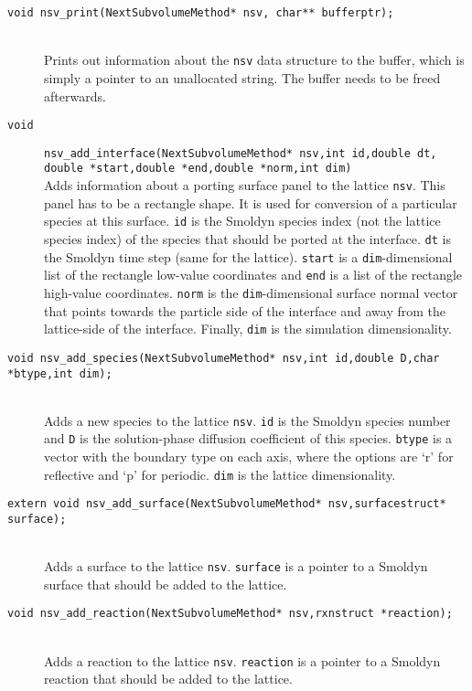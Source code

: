 \documentclass {scrbook}
\newcommand {\ttt} {\texttt}
\begin{document}
\begin{description}
\item[\ttt{void nsv\_print(NextSubvolumeMethod* nsv, char** bufferptr);}]
\hfill \\
Prints out information about the \ttt{nsv} data structure to the buffer, which is simply a pointer to an unallocated string. The buffer needs to be freed afterwards.

\item[\ttt{void}]
\ttt{nsv\_add\_interface(NextSubvolumeMethod* nsv,int id,double dt, double *start,double *end,double *norm,int dim)}
\hfill \\
Adds information about a porting surface panel to the lattice \ttt{nsv}. This panel has to be a rectangle shape. It is used for conversion of a particular species at this surface. \ttt{id} is the Smoldyn species index (not the lattice species index) of the species that should be ported at the interface. \ttt{dt} is the Smoldyn time step (same for the lattice). \ttt{start} is a \ttt{dim}-dimensional list of the rectangle low-value coordinates and \ttt{end} is a list of the rectangle high-value coordinates. \ttt{norm} is the \ttt{dim}-dimensional surface normal vector that points towards the particle side of the interface and away from the lattice-side of the interface. Finally, \ttt{dim} is the simulation dimensionality.

\item[\ttt{void nsv\_add\_species(NextSubvolumeMethod* nsv,int id,double D,char *btype,int dim);}]
\hfill \\
Adds a new species to the lattice \ttt{nsv}. \ttt{id} is the Smoldyn species number and \ttt{D} is the solution-phase diffusion coefficient of this species. \ttt{btype} is a vector with the boundary type on each axis, where the options are `r' for reflective and `p' for periodic. \ttt{dim} is the lattice dimensionality.

\item[\ttt{extern void nsv\_add\_surface(NextSubvolumeMethod* nsv,surfacestruct* surface);}]
\hfill \\
Adds a surface to the lattice \ttt{nsv}. \ttt{surface} is a pointer to a Smoldyn surface that should be added to the lattice.

\item[\ttt{void nsv\_add\_reaction(NextSubvolumeMethod* nsv,rxnstruct *reaction);}]
\hfill \\
Adds a reaction to the lattice \ttt{nsv}. \ttt{reaction} is a pointer to a Smoldyn reaction that should be added to the lattice.


\end{description}
\end{document}
